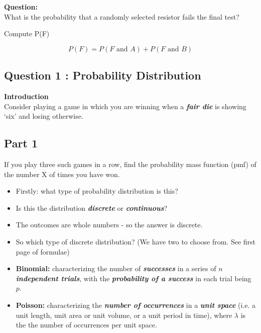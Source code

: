\documentclass[]{report}
\begin{document}


\textbf{Question:} \\ What is the probability that a randomly selected resistor fails the final test?

Compute P(F) 

\[	P(F) = P(F \mbox{ and } A) + P(F\mbox{ and }B)\]





\subsection{Question 1 : Probability Distribution}

\noindent \textbf{Introduction}\\

Consider playing a game in which you are winning when a \textbf{\emph{fair die}} is showing `six'
and losing otherwise.

\subsection{Part 1}If you play three such games in a row, find the probability mass function (pmf) of the number
X of times you have won.

{
	\begin{itemize}
		\item Firstly: what type of probability distribution is this?
		
		\item Is this the distribution \textbf{\emph{discrete}} or  \textbf{\emph{continuous}}?
		
		\item The outcomes are whole numbers - so the answer is discrete.
		
		\item So which type of discrete distribution? (We have two to choose from. See first page of formulae)
		
		
		\item \textbf{Binomial:} characterizing the number of \textbf{\emph{successes}} in a series of \textbf{\emph{$n$ independent trials}}, with the \textbf{\emph{probability of a success}} in each trial being $p$.
		
		\item \textbf{Poisson:}  characterizing the \textbf{\emph{number of occurrences}} in a \textbf{\emph{unit space}} (i.e. a unit length, unit area or unit volume, or a unit period in time), where $\lambda$ is the the number of occurrences per unit space.
		
	\end{itemize}
}
\end{document}
